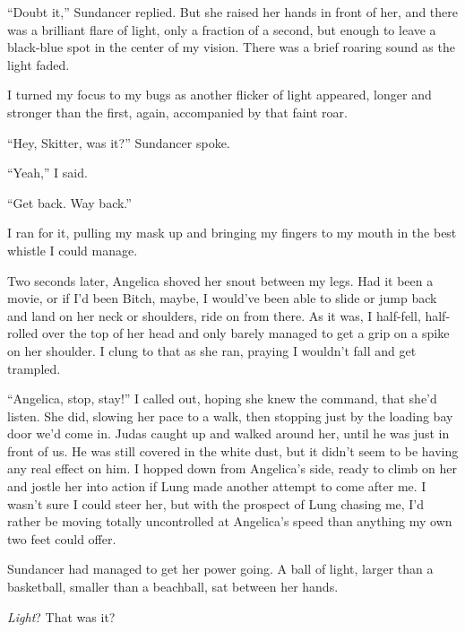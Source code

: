 ``Doubt it,'' Sundancer replied.  But she raised her hands in front of her, and there was a brilliant flare of light, only a fraction of a second, but enough to leave a black-blue spot in the center of my vision.  There was a brief roaring sound as the light faded.



I turned my focus to my bugs as another flicker of light appeared, longer and stronger than the first, again, accompanied by that faint roar.



``Hey, Skitter, was it?'' Sundancer spoke.



``Yeah,'' I said.



``Get back.  Way back.''



I ran for it, pulling my mask up and bringing my fingers to my mouth in the best whistle I could manage.



Two seconds later, Angelica shoved her snout between my legs.  Had it been a movie, or if I'd been Bitch, maybe, I would've been able to slide or jump back and land on her neck or shoulders, ride on from there.  As it was, I half-fell, half-rolled over the top of her head and only barely managed to get a grip on a spike on her shoulder.  I clung to that as she ran, praying I wouldn't fall and get trampled.



``Angelica, stop, stay!'' I called out, hoping she knew the command, that she'd listen.  She did, slowing her pace to a walk, then stopping just by the loading bay door we'd come in.  Judas caught up and walked around her, until he was just in front of us.  He was still covered in the white dust, but it didn't seem to be having any real effect on him.  I hopped down from Angelica's side, ready to climb on her and jostle her into action if Lung made another attempt to come after me.  I wasn't sure I could steer her, but with the prospect of Lung chasing me, I'd rather be moving totally uncontrolled at Angelica's speed than anything my own two feet could offer.



Sundancer had managed to get her power going.  A ball of light, larger than a basketball, smaller than a beachball, sat between her hands.



\emph{Light}?  That was it?



